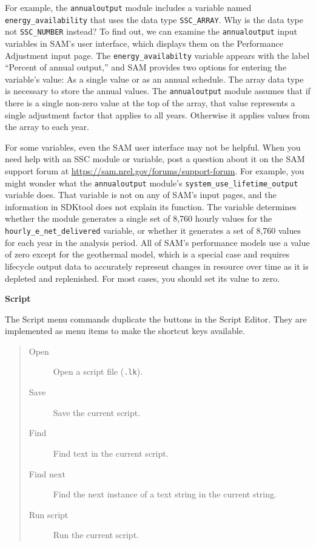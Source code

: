\documentclass{scrartcl} %
\newcommand{\+}{\discretionary{\mbox{\scriptsize$\hookleftarrow$}}{}{}}
\begin{document}
For example, the \texttt{annualoutput} module includes a variable named \texttt{energy\_availability} that uses the data type \texttt{SSC\_ARRAY}. Why is the data type not \texttt{SSC\_NUMBER} instead? To find out, we can examine the \texttt{annualoutput} input variables in SAM's user interface, which displays them on the Performance Adjustment input page. The \texttt{energy\_availabilty} variable appears with the label ``Percent of annual output,'' and SAM provides two options for entering the variable's value: As a single value or as an annual schedule. The array data type is necessary to store the annual values. The \texttt{annualoutput} module assumes that if there is a single non-zero value at the top of the array, that value represents a single adjustment factor that applies to all years. Otherwise it applies values from the array to each year.

For some variables, even the SAM user interface may not be helpful. When you need help with an SSC module or variable, post a question about it on the SAM support forum at \url{https://sam.nrel.gov/forums/support-forum}. For example, you might wonder what the \texttt{annualoutput} module's \texttt{system\_use\_lifetime\_output} variable does. That variable is not on any of SAM's input pages, and the information in SDKtool does not explain its function. The variable determines whether the module generates a single set of 8,760 hourly values for the \texttt{hourly\_e\_net\_delivered} variable, or whether it generates a set of 8,760 values for each year in the analysis period. All of SAM's performance models use a value of zero except for the geothermal model, which is a special case and requires lifecycle output data to accurately represent changes in resource over time as it is depleted and replenished. For most cases, you should set its value to zero.

\textbf{Script}

The Script menu commands duplicate the buttons in the Script Editor. They are implemented as menu items to make the shortcut keys available.

\begin{quote}
\begin{description}
\item[Open] Open a script file (\texttt{.lk}).
\item[Save] Save the current script.
\item[Find] Find text in the current script.
\item[Find next] Find the next instance of a text string in the current string.
\item[Run script] Run the current script. 
\end{description}
\end{quote}
\end{document}

